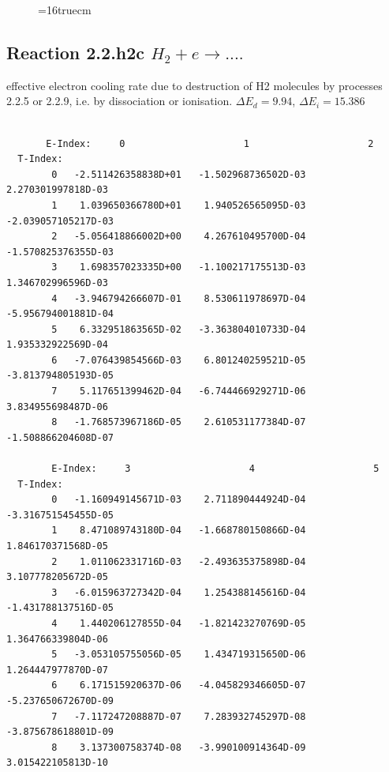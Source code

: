\documentclass[12pt,dvipdfmx]{article}
\begin{document}
\begin{small}
\begin{verbatim}
\end{verbatim}\end{small}
\begin{figure} \label{2.1.8ro}
\epsfxsize=16truecm
\end{figure}
\newpage

\subsection{
  Reaction 2.2.h2c $H_2 + e \rightarrow  ....$
}

   effective electron cooling rate due to destruction of H2 molecules by
   processes 2.2.5 or 2.2.9, i.e. by dissociation or ionisation.
$\Delta E_d = 9.94$, $\Delta E_i = 15.386$


\begin{small}\begin{verbatim}

       E-Index:     0                     1                     2
  T-Index:
        0   -2.511426358838D+01   -1.502968736502D-03    2.270301997818D-03
        1    1.039650366780D+01    1.940526565095D-03   -2.039057105217D-03
        2   -5.056418866002D+00    4.267610495700D-04   -1.570825376355D-03
        3    1.698357023335D+00   -1.100217175513D-03    1.346702996596D-03
        4   -3.946794266607D-01    8.530611978697D-04   -5.956794001881D-04
        5    6.332951863565D-02   -3.363804010733D-04    1.935332922569D-04
        6   -7.076439854566D-03    6.801240259521D-05   -3.813794805193D-05
        7    5.117651399462D-04   -6.744466929271D-06    3.834955698487D-06
        8   -1.768573967186D-05    2.610531177384D-07   -1.508866204608D-07

        E-Index:     3                     4                     5
  T-Index:
        0   -1.160949145671D-03    2.711890444924D-04   -3.316751545455D-05
        1    8.471089743180D-04   -1.668780150866D-04    1.846170371568D-05
        2    1.011062331716D-03   -2.493635375898D-04    3.107778205672D-05
        3   -6.015963727342D-04    1.254388145616D-04   -1.431788137516D-05
        4    1.440206127855D-04   -1.821423270769D-05    1.364766339804D-06
        5   -3.053105755056D-05    1.434719315650D-06    1.264447977870D-07
        6    6.171515920637D-06   -4.045829346605D-07   -5.237650672670D-09
        7   -7.117247208887D-07    7.283932745297D-08   -3.875678618801D-09
        8    3.137300758374D-08   -3.990100914364D-09    3.015422105813D-10


\end{verbatim}
\end{small}
\end{document}
